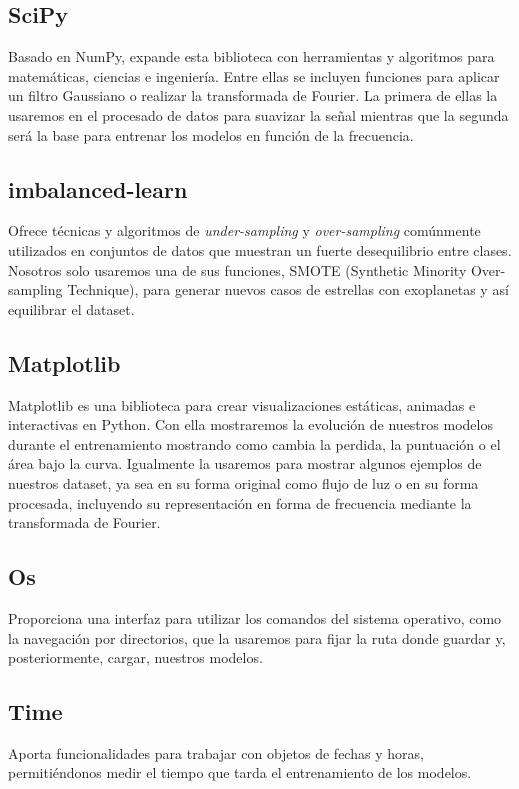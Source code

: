 \subsection{SciPy}
Basado en NumPy, expande esta biblioteca con herramientas y algoritmos para matemáticas, ciencias e ingeniería. Entre ellas se incluyen funciones para aplicar un filtro Gaussiano o realizar la transformada de Fourier. La primera de ellas la usaremos en el procesado de datos para suavizar la señal mientras que la segunda será la base para entrenar los modelos en función de la frecuencia.

\subsection{imbalanced-learn}
Ofrece técnicas y algoritmos de \textit{under-sampling} y \textit{over-sampling} comúnmente utilizados en conjuntos de datos que muestran un fuerte desequilibrio entre clases. Nosotros solo usaremos una de sus funciones, SMOTE (Synthetic Minority Over-sampling Technique), para generar nuevos casos de estrellas con exoplanetas y así equilibrar el dataset.

\subsection{Matplotlib}
Matplotlib es una biblioteca para crear visualizaciones estáticas, animadas e interactivas en Python. Con ella mostraremos la evolución de nuestros modelos durante el entrenamiento mostrando como cambia la perdida, la puntuación o el área bajo la curva. Igualmente la usaremos para mostrar algunos ejemplos de nuestros dataset, ya sea en su forma original como flujo de luz o en su forma procesada, incluyendo su representación en forma de frecuencia mediante la transformada de Fourier.

\subsection{Os}
Proporciona una interfaz para utilizar los comandos del sistema operativo, como la navegación por directorios, que la usaremos para fijar la ruta donde guardar y, posteriormente, cargar, nuestros modelos.

\subsection{Time}
Aporta funcionalidades para trabajar con objetos de fechas y horas, permitiéndonos medir el tiempo que tarda el entrenamiento de los modelos.

